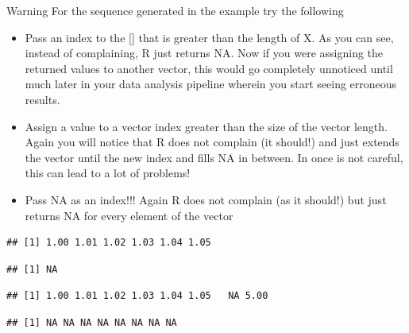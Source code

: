 \documentclass[12pt]{book}\usepackage{knitr}
\begin{document}
\begin{DIY}{Warning}
For the sequence generated in the example try the following
\begin{itemize}
  \item Pass an index to the [] that is greater than the length of X. As you can see, instead of complaining, R just returns NA. Now if you were assigning the returned values to another vector, this would go completely unnoticed until much later in your data analysis pipeline wherein you start seeing erroneous results.
  \item Assign a value to a vector index greater than the size of the vector length. Again you will notice that R does not complain (it should!) and just extends the vector until the new index and fills NA in between. In once is not careful, this can lead to a lot of problems!  
  \item Pass NA as an index!!! Again R does not complain (as it should!) but just returns NA for every element of the vector
\end{itemize}
\begin{knitrout}
\color{fgcolor}\begin{kframe}
\begin{alltt}
\hlkwb{<-}\hlstd{(}\hlstd{,}\hlstd{,}\hlstd{=}\hlstd{)}
\end{alltt}
\begin{verbatim}
## [1] 1.00 1.01 1.02 1.03 1.04 1.05
\end{verbatim}
\begin{alltt}
\hlstd{X[}\hlstd{]}
\end{alltt}
\begin{verbatim}
## [1] NA
\end{verbatim}
\begin{alltt}
\hlstd{X[}\hlstd{]}\hlkwb{<-}
\end{alltt}
\begin{verbatim}
## [1] 1.00 1.01 1.02 1.03 1.04 1.05   NA 5.00
\end{verbatim}
\begin{alltt}
\hlstd{X[}\hlstd{]}
\end{alltt}
\begin{verbatim}
## [1] NA NA NA NA NA NA NA NA
\end{verbatim}
\end{kframe}
\end{knitrout}
\end{DIY}
\end{document}
